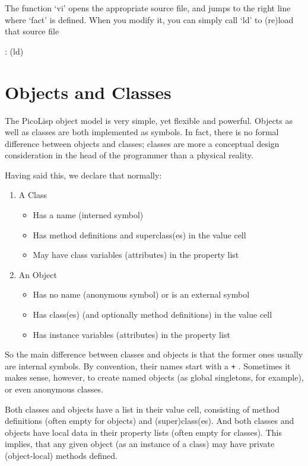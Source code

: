 The function `vi' opens the appropriate source file, and jumps to the
right line where `fact' is defined. When you modify it, you can simply
call `ld' to (re)load that source file


\begin{wideverbatim}
: (ld)
\end{wideverbatim}

 
\section{Objects and Classes}
\label{sec:tut-objects-and-classes}


The PicoLisp object model is very simple, yet flexible and powerful.
Objects as well as classes are both implemented as symbols. In fact,
there is no formal difference between objects and classes; classes are
more a conceptual design consideration in the head of the programmer
than a physical reality.

Having said this, we declare that normally:

\begin{enumerate}
\item A Class
\begin{itemize}
\item Has a name (interned symbol)
\item Has method definitions and superclass(es) in the value cell
\item May have class variables (attributes) in the property list
\end{itemize}
\item An Object
\begin{itemize}
\item Has no name (anonymous symbol) or is an external symbol
\item Has class(es) (and optionally method definitions) in the value
      cell
\item Has instance variables (attributes) in the property list
\end{itemize}
\end{enumerate}

So the main difference between classes and objects is that the former
ones usually are internal symbols. By convention, their names start with
a  \texttt{+} . Sometimes it makes sense, however, to create named objects (as
global singletons, for example), or even anonymous classes.

Both classes and objects have a list in their value cell, consisting of
method definitions (often empty for objects) and (super)class(es). And
both classes and objects have local data in their property lists (often
empty for classes). This implies, that any given object (as an instance
of a class) may have private (object-local) methods defined.

